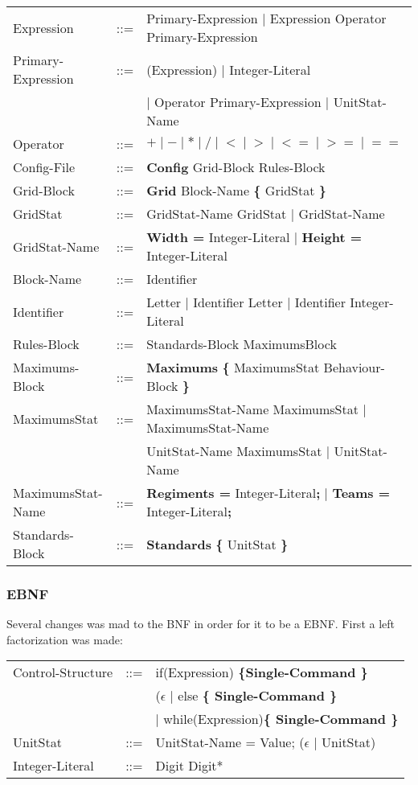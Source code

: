 \begin{tabular}{ l l l }
			Expression 		   &	::=	 & Primary-Expression $\mid$ Expression Operator Primary-Expression \\
			Primary-Expression &	::=  & (Expression) $\mid$ Integer-Literal \\
							   &		 & $\mid$ Operator Primary-Expression $\mid$ UnitStat-Name \\
			Operator 		   & 	::=	 & $\boldsymbol {+} \mid \boldsymbol {-} \mid  \boldsymbol {*}\mid 
										    \boldsymbol {/} \mid \boldsymbol {<} \mid  \boldsymbol {>} \mid
										    \boldsymbol {<=} \mid  \boldsymbol {>=} \mid \boldsymbol {==}$\\
			Config-File		   & 	::=  & {\bf Config} Grid-Block Rules-Block  		\\
			Grid-Block		   &	::=	 & {\bf Grid} Block-Name	 {\bf \{} GridStat \bf{\}} \\
			GridStat		   &	::=  & GridStat-Name GridStat $\mid$ GridStat-Name   \\
			GridStat-Name	   &	::=  & {\bf Width = } Integer-Literal $\mid$ {\bf Height = } Integer-Literal \\
			Block-Name		   &	::=  & Identifier							\\
			Identifier		   &    ::=  & Letter $\mid$ Identifier Letter $\mid$ Identifier Integer-Literal \\
			Rules-Block		   &	::=	 & Standards-Block MaximumsBlock 				\\
			Maximums-Block	   &	::=	 & {\bf Maximums} {\bf \{} MaximumsStat Behaviour-Block {\bf \}}	\\
			MaximumsStat	   &	::=  & MaximumsStat-Name MaximumsStat $\mid$ MaximumsStat-Name		\\
							   &	     & UnitStat-Name MaximumsStat $\mid$ UnitStat-Name			\\
			MaximumsStat-Name  &	::=  & {\bf Regiments = } Integer-Literal{\bf ;} $\mid$ {\bf Teams = } Integer-Literal{\bf ;} \\
			Standards-Block	   &    ::=  & {\bf Standards} {\bf \{ } UnitStat \bf{\} }		\\
		\end{tabular}
		
	\subsubsection{EBNF}
		Several changes was mad to the BNF in order for it to be a EBNF. First a left factorization was made:
		\begin{tabular}{ l l l }
			Control-Structure  &  	::=  & if(Expression) \bf{\{}Single-Command \bf{\}}  \\
							   &  	     & ($\epsilon$ $\mid$ else \bf{\{ }Single-Command \bf{\} } \\					   
							   &   		 & $\mid$ while(Expression)\bf{\{ } Single-Command \bf{\}} \\
	  		UnitStat		   &	::=  & UnitStat-Name = Value; ($\epsilon$ $\mid$ UnitStat) \\
			Integer-Literal    &	::=  & Digit Digit* 
			
								
		\end{tabular}
							   
							   